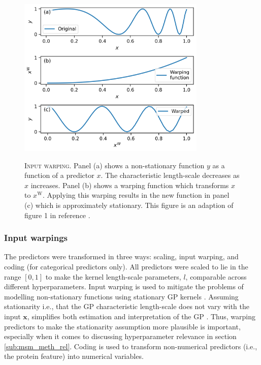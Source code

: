 \begin{figure}
    \centering
    \caption[Input warping]{\textsc{Input warping}. Panel (a) shows a non-stationary function $y$ as a function of a predictor $x$. The characteristic length-scale decreases as $x$ increases. Panel (b) shows a warping function which transforms $x$ to $x^\mathrm{W}$. Applying this warping results in the new function in panel (c) which is approximately stationary. This figure is an adaption of figure 1 in reference \cite{snoekInputWarpingBayesian2014a}.}
    \includegraphics[width=0.8\textwidth]{chapters/msm_optimization/figures/warping_explainer.png}
    \label{fig:msm_warping_explainer}
\end{figure}

\subsubsection*{Input warpings}

The predictors were transformed in three ways: scaling,  input warping, and coding (for categorical predictors only). All predictors were scaled to lie in the range $[0, 1]$ to make the kernel length-scale parameters, $l$, comparable across different hyperparameters. Input warping is used to mitigate the problems of modelling non-stationary functions using stationary GP kernels \cite{snoekInputWarpingBayesian2014a}. Assuming stationarity i.e., that the GP characteristic length-scale  does not vary with the input $\mathbf{x}$, simplifies both estimation and interpretation of the GP \cite{snoekInputWarpingBayesian2014a}. Thus, warping predictors to make the stationarity assumption more plausible is important, especially when it comes to discussing hyperparameter relevance in section \ref{sub:msm_meth_rel}. Coding is used to transform non-numerical predictors (i.e., the protein feature) into numerical variables. 

